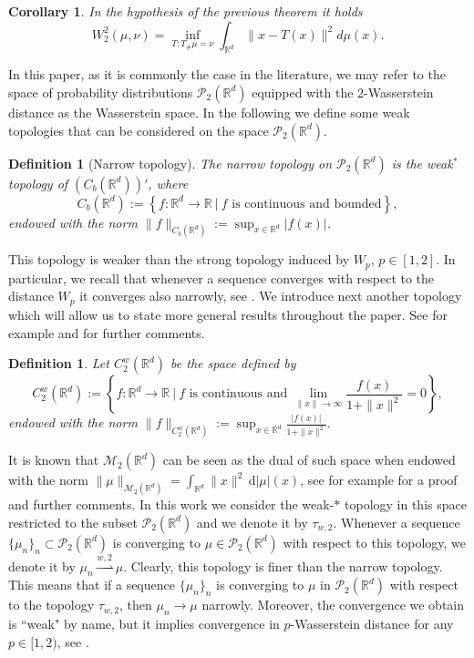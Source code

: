 \documentclass[11pt]{article}
\newtheorem{corollary}[theorem]{Corollary}
\newtheorem{defi}[theorem]{Definition}
\newcommand{\cM}{\mathcal{M}}
\newcommand{\cP}{\mathcal{P}}
\newcommand{\R}{\mathbb{R}}
\newcommand{\wsto}{\overset{w,2}{\rightharpoonup}}
\numberwithin{equation}{section}
\begin{document}
\begin{corollary}
	In the hypothesis of the previous theorem it holds
	\[
	W_2^2(\mu, \nu) = \inf_{T: T_{\#}\mu = \nu} \int_{\mathbb{R}^d} \|x - T(x)\|^2 d\mu(x).
	\]
\end{corollary}

In this paper, as it is commonly the case in the literature, we may refer to the space of probability distributions $\mathcal{P}_2(\mathbb{R}^d)$ equipped with the 2-Wasserstein distance as the Wasserstein space. In the following we define some weak topologies that can be considered on the space $\mathcal{P}_2(\mathbb{R}^d)$.

\begin{defi}[Narrow topology] The narrow topology on $\cP_2(\R^d)$ is the weak$^*$ topology of $(C_b(\R^d))'$, where
	\[C_b(\R^d):=\left\{f:\R^d\to \R \ \big| \ f \text{ is continuous and bounded}\right\},\]
	endowed with the norm
	$\|f\|_{C_b(\R^d)}:=\sup_{x \in \R^d} |f(x)|$.
\end{defi}

This topology is weaker than the strong topology induced by $W_p$, $p\in[1,2]$. In particular, we recall that whenever a sequence converges with respect to the distance $W_p$ it converges also narrowly, see \cite[Lemma 5.1.7]{AGS08}. We introduce next another topology which will allow us to state more general results throughout the paper. See for example \cite[Section 3]{NS2021} and \cite[Section 5]{BCIKNV24} for further comments.

\begin{defi}
	Let $C_2^w(\R^d)$ be the space defined by
	\[C_2^w(\R^d):=\left\{f:\R^d\to \R \ \big| \ f \text{ is continuous and } \lim_{\|x\|\to \infty}\frac{f(x)}{1+\|x\|^2}=0\right\},\]
	endowed with the norm
	$\|f\|_{C_2^w(\R^d)}:=\sup_{x \in \R^d} \frac{|f(x)|}{1+\|x\|^2}$.	
\end{defi}

It is known that $\mathcal{M}_2(\R^d)$ can be seen as the dual of such space when endowed with the norm $\|\mu\|_{\cM_2(\R^d)}=\int_{\R^d} \|x\|^2 \,\mathrm{d}|\mu|(x)$, see for example \cite[Section 5]{BCIKNV24} for a proof and further comments. In this work we consider the weak-$*$ topology in this space restricted to the subset $\mathcal{P}_2(\R^d)$ and we denote it by $\tau_{w,2}$. Whenever a sequence $\{\mu_n\}_n \subset \mathcal{P}_2(\R^d)$ is converging to $\mu \in \mathcal{P}_2(\R^d)$ with respect to this topology, we denote it by $\mu_n \wsto \mu$. Clearly, this topology is finer than the narrow topology. This means that if a sequence $\{\mu_n\}_n$ is converging to $\mu$ in $\cP_2(\R^d)$ with respect to the topology $\tau_{w,2}$, then $\mu_n\to \mu$ narrowly. Moreover, the convergence we obtain is ``weak" by name, but it implies convergence in $p$-Wasserstein distance for any $p\in [1,2)$, see \cite[Remark 7.1.11]{AGS08}.
\end{document}

